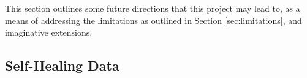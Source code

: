 This section outlines some future directions that this project may lead to, as a means of addressing the limitations as outlined in Section \ref{sec:limitations}, and imaginative extensions.

\subsection{Self-Healing Data}

